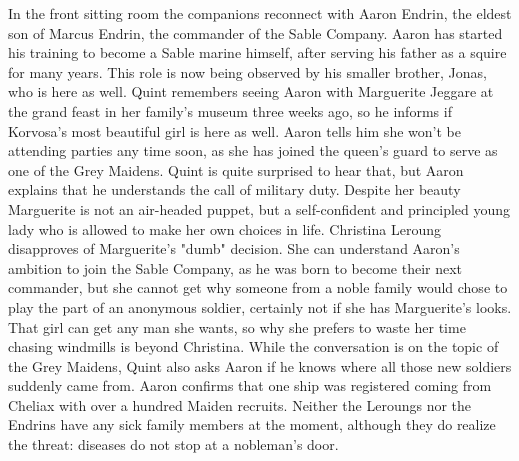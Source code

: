 In the front sitting room the companions reconnect with Aaron Endrin, the eldest son of Marcus Endrin, the commander of the Sable Company. Aaron has started his training to become a Sable marine himself, after serving his father as a squire for many years. This role is now being observed by his smaller brother, Jonas, who is here as well. Quint remembers seeing Aaron with Marguerite Jeggare at the grand feast in her family's museum three weeks ago, so he informs if Korvosa's most beautiful girl is here as well. Aaron tells him she won't be attending parties any time soon, as she has joined the queen's guard to serve as one of the Grey Maidens. Quint is quite surprised to hear that, but Aaron explains that he understands the call of military duty. Despite her beauty Marguerite is not an air-headed puppet, but a self-confident and principled young lady who is allowed to make her own choices in life. Christina Leroung disapproves of Marguerite's "dumb" decision. She can understand Aaron's ambition to join the Sable Company, as he was born to become their next commander, but she cannot get why someone from a noble family would chose to play the part of an anonymous soldier, certainly not if she has Marguerite's looks. That girl can get any man she wants, so why she prefers to waste her time chasing windmills is beyond Christina. While the conversation is on the topic of the Grey Maidens, Quint also asks Aaron if he knows where all those new soldiers suddenly came from. Aaron confirms that one ship was registered coming from Cheliax with over a hundred Maiden recruits. Neither the Leroungs nor the Endrins have any sick family members at the moment, although they do realize the threat: diseases do not stop at a nobleman's door.\\

